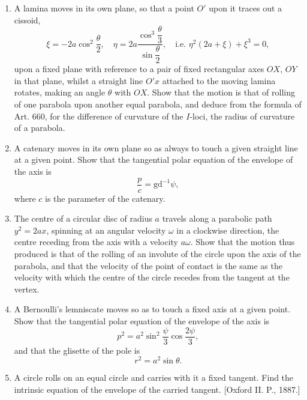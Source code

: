\documentclass[11pt, a4paper]{article}
\newcommand{\source}[1]{\hfill\textnormal{[#1]}}
\begin{document}
\begin{enumerate}[leftmargin=2em]
Reduce this motion to rolling. Also show that the difference of the curvatures of the loci of the instantaneous centre on the lamina and on the fixed plane is $\dfrac{\cos^2\psi}{c}$.

Show further that the intrinsic equation of the envelope of the line attached to the lamina is
\[
\frac{ds}{d\psi}=c\sec\psi\tan\psi+c\log(\sec\psi+\tan\psi).
\]

\item A lamina moves in its own plane, so that a point $O'$ upon it traces out a cissoid,
\[
\xi=-2a\cos^2\frac{\theta}{2},\quad \eta=2a\frac{\cos^3\dfrac{\theta}{3}}{\sin\dfrac{\theta}{2}},\quad\text{i.e. }\eta^2(2a+\xi)+\xi^3=0,
\]
upon a fixed plane with reference to a pair of fixed rectangular axes $OX$, $OY$ in that plane, whilst a straight line $O'x$ attached to the moving lamina rotates, making an angle $\theta$ with $OX$. Show that the motion is that of rolling of one parabola upon another equal parabola, and deduce from the formula of Art. 660, for the difference of curvature of the $I$-loci, the radius of curvature of a parabola.

\item A catenary moves in its own plane so as always to touch a given straight line at a given point. Show that the tangential polar equation of the envelope of the axis is
\[
\frac{p}{c}=\mathrm{gd}^{-1}\psi,
\]
where $c$ is the parameter of the catenary.

\item The centre of a circular disc of radius $a$ travels along a parabolic path $y^2=2ax$, spinning at an angular velocity $\omega$ in a clockwise direction, the centre receding from the axis with a velocity $a\omega$. Show that the motion thus produced is that of the rolling of an involute of the circle upon the axis of the parabola, and that the velocity of the point of contact is the same as the velocity with which the centre of the circle recedes from the tangent at the vertex.

\item A Bernoulli's lemniscate moves so as to touch a fixed axis at a given point. Show that the tangential polar equation of the envelope of the axis is
\[
p^2=a^2\sin^2\frac{\psi}{3}\cos\frac{2\psi}{3},
\]
and that the glisette of the pole is
\[
r^2=a^2\sin\theta.
\]

\item A circle rolls on an equal circle and carries with it a fixed tangent. Find the intrinsic equation of the envelope of the carried tangent. \source{Oxford II. P., 1887.}


\end{enumerate}
\end{document}
